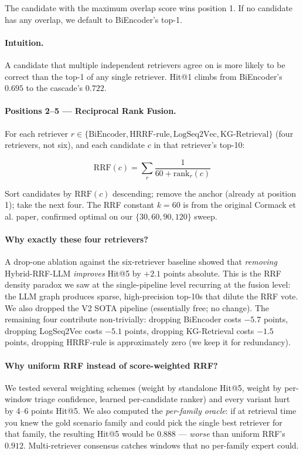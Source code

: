 The candidate with the maximum overlap score wins position 1. If no candidate has any overlap, we default to BiEncoder's top-1.

\paragraph{Intuition.} A candidate that multiple independent retrievers agree on is more likely to be correct than the top-1 of any single retriever. Hit@1 climbs from BiEncoder's $0.695$ to the cascade's $0.722$.

\paragraph{Positions 2--5 --- Reciprocal Rank Fusion.}

For each retriever $r \in \{\text{BiEncoder}, \text{HRRF-rule}, \text{LogSeq2Vec}, \text{KG-Retrieval}\}$ (four retrievers, not six), and each candidate $c$ in that retriever's top-10:

\[
\text{RRF}(c) = \sum_r \frac{1}{60 + \text{rank}_r(c)}
\]

Sort candidates by $\text{RRF}(c)$ descending; remove the anchor (already at position 1); take the next four. The RRF constant $k = 60$ is from the original Cormack et al. paper, confirmed optimal on our $\{30, 60, 90, 120\}$ sweep.

\paragraph{Why exactly these four retrievers?} A drop-one ablation against the six-retriever baseline showed that \emph{removing} Hybrid-RRF-LLM \emph{improves} Hit@5 by $+2.1$ points absolute. This is the RRF density paradox we saw at the single-pipeline level recurring at the fusion level: the LLM graph produces sparse, high-precision top-10s that dilute the RRF vote. We also dropped the V2 SOTA pipeline (essentially free; no change). The remaining four contribute non-trivially: dropping BiEncoder costs $-5.7$ points, dropping LogSeq2Vec costs $-5.1$ points, dropping KG-Retrieval costs $-1.5$ points, dropping HRRF-rule is approximately zero (we keep it for redundancy).

\paragraph{Why uniform RRF instead of score-weighted RRF?} We tested several weighting schemes (weight by standalone Hit@5, weight by per-window triage confidence, learned per-candidate ranker) and every variant hurt by 4--6 points Hit@5. We also computed the \emph{per-family oracle}: if at retrieval time you knew the gold scenario family and could pick the single best retriever for that family, the resulting Hit@5 would be $0.888$ --- \emph{worse} than uniform RRF's $0.912$. Multi-retriever consensus catches windows that no per-family expert could.

